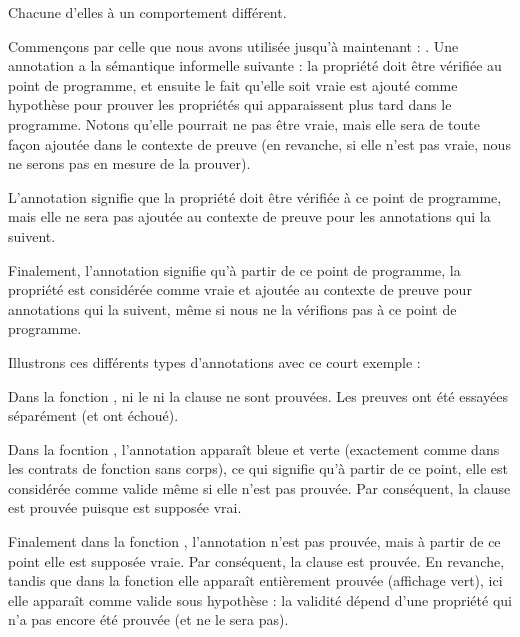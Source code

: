 Chacune d'elles à un comportement différent.


Commençons par celle que nous avons utilisée jusqu'à maintenant :
. Une annotation  a la sémantique
informelle suivante : la propriété  doit être vérifiée au point
de programme, et ensuite le fait qu'elle soit vraie est ajouté comme hypothèse
pour prouver les propriétés qui apparaissent plus tard dans le programme. Notons
qu'elle pourrait ne pas être vraie, mais elle sera de toute façon ajoutée dans
le contexte de preuve (en revanche, si elle n'est pas vraie, nous ne serons pas
en mesure de la prouver).


L'annotation  signifie que la propriété  doit
être vérifiée à ce point de programme, mais elle ne sera pas ajoutée au contexte
de preuve pour les annotations qui la suivent.


Finalement, l'annotation  signifie qu'à partir de ce point
de programme, la propriété  est considérée comme vraie et ajoutée
au contexte de preuve pour annotations qui la suivent, même si nous ne la
vérifions pas à ce point de programme.


Illustrons ces différents types d'annotations avec ce court exemple :






Dans la fonction , ni le  ni la
clause  ne sont prouvées. Les preuves ont été essayées
séparément (et ont échoué).


Dans la focntion , l'annotation 
apparaît bleue et verte (exactement comme dans les contrats de fonction sans
corps), ce qui signifie qu'à partir de ce point, elle est considérée comme
valide même si elle n'est pas prouvée. Par conséquent, la clause
 est prouvée puisque  est
supposée vrai.


Finalement dans la fonction , l'annotation
 n'est pas prouvée, mais à partir de ce point elle est
supposée vraie. Par conséquent, la clause  est prouvée.
En revanche, tandis que dans la fonction  elle
apparaît entièrement prouvée (affichage vert), ici elle apparaît comme valide
sous hypothèse : la validité dépend d'une propriété qui n'a pas encore été
prouvée (et ne le sera pas).


